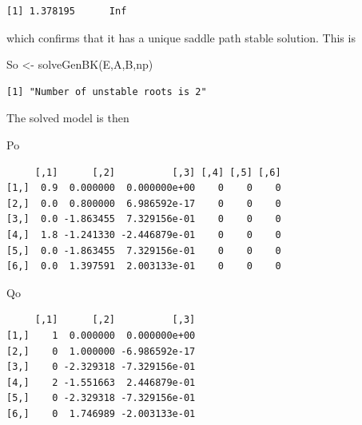 \documentclass[
  letterpaper,
]{book}
\newenvironment{Shaded}{\begin{snugshade}}{\end{snugshade}}
\newcommand{\FunctionTok}[1]{\textcolor[rgb]{0.28,0.35,0.67}{#1}}
\newcommand{\NormalTok}[1]{\textcolor[rgb]{0.00,0.23,0.31}{#1}}
\newcommand{\OtherTok}[1]{\textcolor[rgb]{0.00,0.23,0.31}{#1}}
\newcommand{\SpecialCharTok}[1]{\textcolor[rgb]{0.37,0.37,0.37}{#1}}
\begin{document}
\begin{verbatim}
[1] 1.378195      Inf
\end{verbatim}

which confirms that it has a unique saddle path stable solution. This is

\begin{Shaded}
\begin{Highlighting}[]
\NormalTok{So }\OtherTok{\textless{}{-}} \FunctionTok{solveGenBK}\NormalTok{(E,A,B,np)}
\end{Highlighting}
\end{Shaded}

\begin{verbatim}
[1] "Number of unstable roots is 2"
\end{verbatim}

\begin{Shaded}
\end{Shaded}

The solved model is then

\begin{Shaded}
\begin{Highlighting}[]
\NormalTok{Po}
\end{Highlighting}
\end{Shaded}

\begin{verbatim}
     [,1]      [,2]          [,3] [,4] [,5] [,6]
[1,]  0.9  0.000000  0.000000e+00    0    0    0
[2,]  0.0  0.800000  6.986592e-17    0    0    0
[3,]  0.0 -1.863455  7.329156e-01    0    0    0
[4,]  1.8 -1.241330 -2.446879e-01    0    0    0
[5,]  0.0 -1.863455  7.329156e-01    0    0    0
[6,]  0.0  1.397591  2.003133e-01    0    0    0
\end{verbatim}

\begin{Shaded}
\begin{Highlighting}[]
\NormalTok{Qo}
\end{Highlighting}
\end{Shaded}

\begin{verbatim}
     [,1]      [,2]          [,3]
[1,]    1  0.000000  0.000000e+00
[2,]    0  1.000000 -6.986592e-17
[3,]    0 -2.329318 -7.329156e-01
[4,]    2 -1.551663  2.446879e-01
[5,]    0 -2.329318 -7.329156e-01
[6,]    0  1.746989 -2.003133e-01
\end{verbatim}
\end{document}
